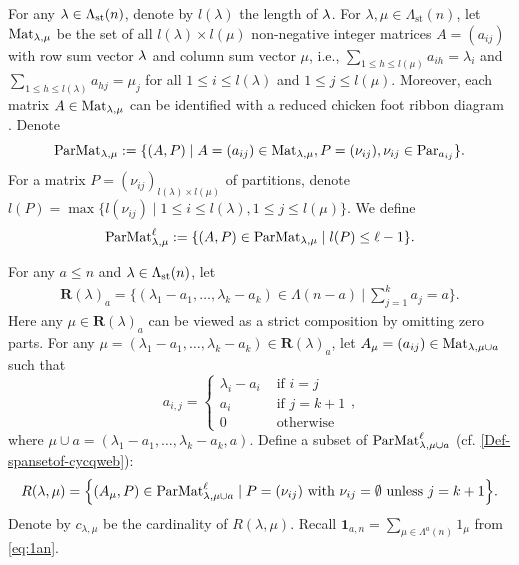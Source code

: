 For any $\lambda\in \Lambda_{\text{st}}(n)$, denote by $l(\lambda)$ the length of $\lambda$. 
For $\lambda,\mu\in \Lambda_{\text{st}}(n)$, let 
$\text{Mat}_{\lambda,\mu}$ be the set of all $l(\lambda)\times l(\mu)$
non-negative integer matrices $A=(a_{ij})$ with row sum vector $\lambda$ and column sum vector $\mu$, i.e.,  $\sum_{1\le h\le l(\mu)}a_{ih}=\lambda_i$ and $\sum_{1\le h\le l(\lambda)}a_{hj}=\mu_j$ for all $1\le i\le l(\lambda) $ and $1\le j\le l(\mu)$.  Moreover, each matrix $A\in \text{Mat}_{\lambda,\mu}$ can be identified with a reduced chicken foot ribbon  diagram \cite[\S 4.1]{SSW25}.  Denote  
\begin{equation*}
 \text{ParMat}_{\lambda,\mu}:=\{ (A, P)\mid  A=(a_{ij})\in \text{Mat}_{\lambda,\mu}, P=(\nu_{ij}), \nu_{ij}\in \text{Par}_{a_{ij}} \}.   
 \end{equation*} 
 For a matrix  $ P=(\nu_{ij})_{l(\lambda)\times l(\mu)}$ of partitions, denote 
$l(P)=\max\{l(\nu_{ij})\mid 1\le i\le l(\lambda), 1\le j\le l(\mu)\}.$
We define
\begin{equation}
\label{Def-spansetof-cycqweb}    
\text{ParMat}_{\lambda,\mu}^\ell:=\{(A,P)\in\text{ParMat}_{\lambda,\mu}\mid l(P)\le \ell-1\}.
\end{equation}


For any $a\le n$ and $\lambda\in \Lambda_{\text{st}}(n)$, let 
\begin{align}
\mathbf R(\lambda)_a =\Big\{(\lambda_1-a_1, \ldots, \lambda_k-a_k)\in \Lambda(n-a)~\Big |~ \sum_{j=1}^ka_j=a \Big\}.
\end{align}
Here any $\mu \in \mathbf R(\lambda)_a$ can be viewed as a strict composition by omitting zero parts.  
For any $\mu=(\lambda_1-a_1, \ldots, \lambda_k-a_k) \in \mathbf R(\lambda)_a $, let $A_\mu=(a_{ij})\in\text{Mat}_{\lambda,\mu\cup a}$
such that 
\[ a_{i,j}=\begin{cases} \lambda_i-a_i & \text{ if $i=j$}\\
    a_i &  \text{ if $j=k+1$}\\
    0& \text{ otherwise}
\end{cases}, 
\]
where $\mu\cup a=(\lambda_1-a_1, \ldots, \lambda_k-a_k,a) $. Define a subset of $\text{ParMat}_{\lambda,\mu\cup a}^\ell$ (cf. \eqref{Def-spansetof-cycqweb}):
\begin{align}
R(\lambda,\mu)=\Big\{(A_\mu,P)\in \text{ParMat}_{\lambda,\mu\cup a}^\ell \mid P=(\nu_{ij}) \text{ with } \nu_{ij}= \emptyset \text{ unless } j=k+1
\Big\}. 
\end{align}
Denote by  $c_{\lambda,\mu} $ be the cardinality of $R(\lambda,\mu)$.
Recall $\mathbf{1}_{a,n}= \sum_{\mu\in \Lambda^a(n)}1_\mu$ from \eqref{eq:1an}.



